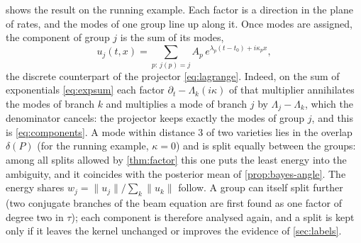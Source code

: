 \documentclass[11pt]{article}
\theoremstyle{plain}
\theoremstyle{definition}
\theoremstyle{remark}
\newcommand{\deltaP}{\delta(P)}             %
\newcommand{\norm}[1]{\lVert#1\rVert}
\begin{document}
 shows the result on the running example. Each factor is a direction in the plane of rates, and the
modes of one group line up along it. Once modes are assigned, the component of group $j$ is the sum of its modes,
\begin{equation}\label{eq:components}
  u_j(t,x)=\sum_{p:\,j(p)=j}A_p\,e^{\lambda_p(t-t_0)+i\kappa_px},
\end{equation}
the discrete counterpart of the projector \eqref{eq:lagrange}. Indeed, on the sum of exponentials \eqref{eq:expsum} each factor $\partial_t-\Lambda_k(i\kappa)$ of that multiplier
annihilates the modes of branch $k$ and multiplies a mode of branch $j$ by $\Lambda_j-\Lambda_k$, which the denominator
cancels: the projector keeps exactly the modes of group $j$, and this is \eqref{eq:components}. A
mode within distance $3$ of two varieties lies in the overlap $\deltaP$ (for the running example, $\kappa=0$) and is split
equally between the groups: among all splits allowed by \cref{thm:factor} this one puts the least energy into the
ambiguity, and it coincides with the posterior mean of \cref{prop:bayes-angle}. The energy shares
$w_j=\norm{u_j}/\sum_k\norm{u_k}$ follow. A group can itself split further (two conjugate branches of the beam equation are
first found as one factor of degree two in $\tau$); each component is therefore analysed again, and a split is kept only
if it leaves the kernel unchanged or improves the evidence of \cref{sec:labels}.
\end{document}
